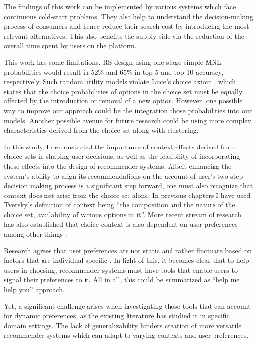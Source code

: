 \documentclass[a4paper,12pt]{article}
\newcommand{\citeyearonly}[1]{\citeyearpar{#1}}
\begin{document}
The findings of this work can be implemented by various systems which face continuous cold-start problems. They also help to understand the decision-making process of consumers and hence reduce their search cost by introducing the most relevant alternatives. This also benefits the supply-side via the reduction of the overall time spent by users on the platform.

This work has some limitations. RS design using one-stage simple MNL probabilities would result in 52\% and 65\% in top-5 and top-10 accuracy, respectively. Such random utility models violate Luce's choice axiom \citep{luce59}, which states that the choice probabilities of options in the choice set must be equally affected by the introduction or removal of a new option. However, one possible way to improve our approach could be the integration those probabilities into our models. Another possible avenue for future research could be using more complex characteristics derived from the choice set along with clustering.


In this study, I demonstrated the importance of context effects derived from choice sets in shaping user decisions, as well as the feasibility of incorporating these effects into the design of recommender systems.
Albeit enhancing the system's ability to align its recommendations on the account of user's two-step decision making process is a significant step forward, one must also recognize that context does not arise from the choice set alone. In previous chapters I have used Tversky's \citeyearonly{tversky1972elimination} definition of context being ``the composition  and the nature of the choice set, availability of various options in it''. More recent stream of research has also established that choice context is also dependent on user preferences among other things \citep{dey2001understanding, adomavicius2011context}.

Research agrees that user preferences are not static and rather fluctuate based on factors that are individual specific \citep{songWhenHowDiversify2019}. In light of this, it becomes clear that to help users in choosing, recommender systems must have tools that enable users to signal their preferences to it. All in all, this could be summarized as ``help me help you'' approach.

Yet, a significant challenge arises when investigating those tools that can account for dynamic preferences, as the existing literature has studied it in specific domain settings. The lack of generalizability hinders creation of more versatile recommender systems which can adapt to varying contexts and user preferences. 
\end{document}

